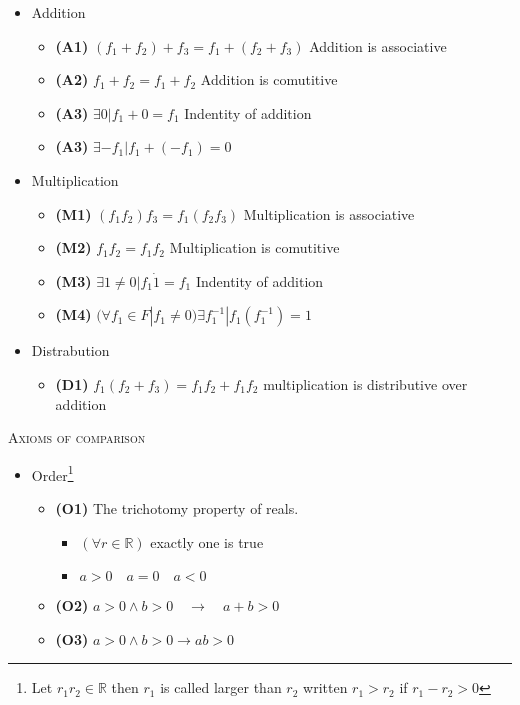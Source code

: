 \documentclass{tufte-book}
\providecommand{\tightlist}{%
  \setlength{\itemsep}{0pt}\setlength{\parskip}{0pt}}
\begin{document}
\begin{itemize}
\tightlist
\item
  Addition

  \begin{itemize}
  \tightlist
  \item
    \textbf{(A1)} \((f_1+f_2)+f_3 = f_1 + (f_2 + f_3)\) Addition is
    associative
  \item
    \textbf{(A2)} \(f_1+f_2 = f_1+f_2\) Addition is comutitive
  \item
    \textbf{(A3)} \(\exists 0 | f_1 + 0 = f_1\) Indentity of addition
  \item
    \textbf{(A3)} \(\exists -f_1 | f_1 + (-f_1) = 0\)
  \end{itemize}
\item
  Multiplication

  \begin{itemize}
  \tightlist
  \item
    \textbf{(M1)} \((f_1 f_2) f_3 = f_1 (f_2 f_3)\) Multiplication is
    associative
  \item
    \textbf{(M2)} \(f_1 f_2 = f_1 f_2\) Multiplication is comutitive
  \item
    \textbf{(M3)} \(\exists 1 \neq 0 | f_1 \dot 1 = f_1\) Indentity of
    addition
  \item
    \textbf{(M4)}
    \((\forall f_1 \in F | f_1 \neq 0) \exists f_1^{-1} | f_1 ( f_1^{-1}) = 1\)
  \end{itemize}
\item
  Distrabution

  \begin{itemize}
  \tightlist
  \item
    \textbf{(D1)} \(f_1(f_2+f_3)=f_1f_2 + f_1f_2\) multiplication is
    distributive over addition
  \end{itemize}
\end{itemize}

\textsc{Axioms of comparison}

\begin{itemize}
\tightlist
\item
  Order\footnote{Let \(r_1 r_2 \in \mathbb{R}\) then \(r_1\) is called
    larger than \(r_2\) written \(r_1 > r_2\) if \(r_1 - r_2 > 0\) }

  \begin{itemize}
  \item
    \textbf{(O1)} The trichotomy property of reals.

    \begin{itemize}
    \tightlist
    \item
      \(\left( \forall r \in \mathbb{R} \right)\) exactly one is true
    \item
      \(a > 0 \quad a = 0 \quad a < 0\)
    \end{itemize}
  \item
    \textbf{(O2)} \(a > 0 \wedge b > 0 \quad \to \quad a + b >0\)
  \item
    \textbf{(O3)} \(a > 0 \wedge b > 0 \to ab >0\)
  \end{itemize}
\end{itemize}
\end{document}
